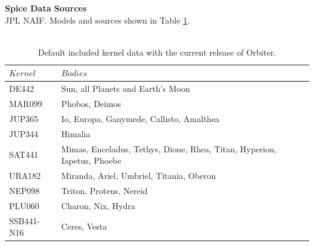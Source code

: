 \documentclass[Orbiter User Manual.tex]{subfiles}
\begin{document}
\textbf{Spice Data Sources}\\
JPL NAIF. Models and sources shown in Table \ref{tab:spicedata}.\\
\\
\begin{table}[]
\begin{tabular}{|l|l|}
\hline
$Kernel$             & $Bodies$                                                                \\ \hline
DE442\cite{DE440}\cite{DE442}     & Sun, all Planets and Earth's Moon                          \\ \hline
MAR099\cite{MAR099}  & Phobos, Deimos                                                          \\ \hline
JUP365\cite{JUP365}  & Io, Europa, Ganymede, Callisto, Amalthea                                \\ \hline
JUP344\cite{JUP344}  & Himalia                                                                 \\ \hline
SAT441\cite{SAT441}  & Mimas, Enceladus, Tethys, Dione, Rhea, Titan, Hyperion, Iapetus, Phoebe \\ \hline
URA182\cite{URA182}  & Miranda, Ariel, Umbriel, Titania, Oberon                                \\ \hline
NEP098\cite{NEP098}  & Triton, Proteus, Nereid                                                 \\ \hline
PLU060\cite{PLU060}  & Charon, Nix, Hydra                                                      \\ \hline
SSB441-N16\cite{SSB441-N16}    & Ceres, Vesta                                                  \\ \hline
\end{tabular}
\caption{Default included kernel data with the current release of Orbiter.}
\label{tab:spicedata}
\end{table}
\end{document}
